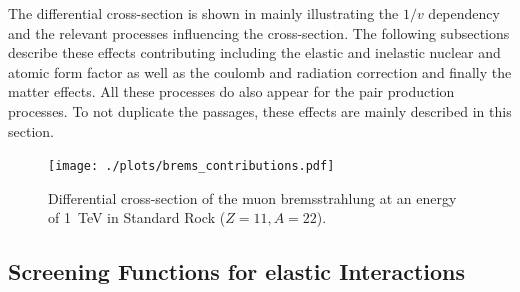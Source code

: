 The differential cross-section is shown in  mainly illustrating the $1/v$ dependency and the relevant processes influencing the cross-section.
The following subsections describe these effects contributing including the elastic and inelastic nuclear and atomic form factor as well as the coulomb and radiation correction and finally the matter effects.
All these processes do also appear for the pair production processes.
To not duplicate the passages, these effects are mainly described in this section.
\begin{figure}
    \centering
    \texttt{[image: ./plots/brems\_contributions.pdf]}
    \caption{Differential cross-section of the muon bremsstrahlung at an energy of \SI{1}{TeV} in Standard Rock ($Z=11, A=22$).}
    \label{fig:brems_dsigma}
\end{figure}

\subsection{Screening Functions for elastic Interactions} \label{sec:brems_screen}

